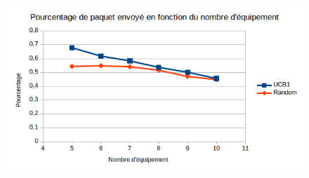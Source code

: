 \documentclass[12pt,a4paper]{article}
\begin{document}
\begin{figure}[h]
    \centering
    \includegraphics[scale=1]{figures/graphe.png}
\end{figure}
\end{document}
